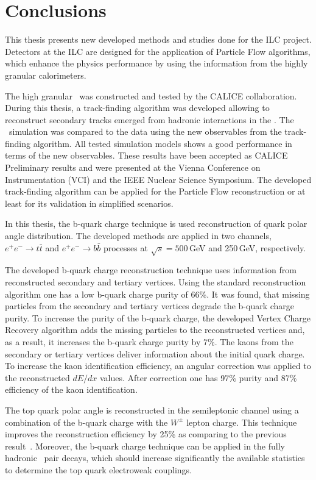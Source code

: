 \section*{Conclusions}
This thesis presents new developed methods and studies done for the ILC project.
Detectors at the ILC are designed for the application of Particle Flow algorithms, which enhance the physics performance by using the information from the highly granular calorimeters. 

The high granular \ecalp\ was constructed and tested by the CALICE collaboration. 
During this thesis, a track-finding algorithm was developed allowing to reconstruct secondary tracks emerged from hadronic interactions in the \ecalp.
The \ecalp\ simulation was compared to the data using the new observables from the track-finding algorithm. 
All tested simulation models shows a good performance in terms of the new observables. 
These results have been accepted as CALICE Preliminary results and were presented at the Vienna Conference on Instrumentation (VCI) and the IEEE Nuclear Science Symposium.
The developed track-finding algorithm can be applied for the Particle Flow reconstruction or at least for its validation in simplified scenarios.

In this thesis, the b-quark charge technique is used reconstruction of quark polar angle distribution.
The developed methods are applied in two channels, $e^+e^-\to t\bar{t}$ and $e^+e^-\to b\bar{b}$ processes at $\sqrt{s} = 500$\,GeV and 250\,GeV, respectively.

The developed b-quark charge reconstruction technique uses information from reconstructed secondary and tertiary vertices. 
Using the standard reconstruction algorithm one has a low b-quark charge purity of 66\%.
It was found, that missing particles from the secondary and tertiary vertices degrade the b-quark charge purity. 
To increase the purity of the b-quark charge, the developed Vertex Charge Recovery algorithm adds the missing particles to the reconstructed vertices and, as a result, it increases the b-quark charge purity by 7\%.
The kaons from the secondary or tertiary vertices deliver information about the initial quark charge. 
To increase the kaon identification efficiency, an angular correction was applied to the reconstructed $dE/dx$ values. 
After correction one has 97\% purity and 87\% efficiency of the kaon identification.

The top quark polar angle is reconstructed in the semileptonic channel using a combination of the b-quark charge with the $W^\pm$ lepton charge. 
This technique improves the reconstruction efficiency by 25\% as comparing to the previous result~\cite{bib:ILCTOP}.
Moreover, the b-quark charge technique can be applied in the fully hadronic \ttbar\ pair decays, which should increase significantly the available statistics to determine the top quark electroweak couplings. 

